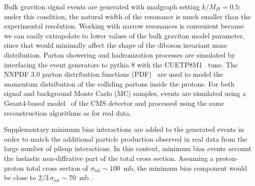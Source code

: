 Bulk graviton signal events are generated with {\sc madgraph} setting $k/M_{Pl} = 0.5$; 
under this condition, the natural width of the resonance is much smaller than the experimental resolution. Working with narrow resonances is convenient because we can easily extrapolate to lower values of the bulk graviton model parameter, since that would minimally affect the shape of the diboson invariant mass distribution.
Parton showering and hadronization processes are simulated by interfacing the event generators to {\sc pythia} 8 with the CUETP8M1~\cite{Skands:2014pea} tune.
The NNPDF 3.0 parton distribution functions (PDF)~\cite{Ball2015} are used to model the momentum distribution of the colliding partons inside the protons. For both signal and background Monte Carlo (MC) samples, events are simulated using a {\sc Geant4}-based model~\cite{GEANT4} of the CMS detector and processed using the same reconstruction algorithms as for real data. 

Supplementary minimum bias interactions are added to the generated events in order to match the additional particle production observed in real data from the large number of pileup interactions. In this context, minimum bias events account the inelastic non-diffrative part of the total cross section. Assuming a proton-proton total cross section of $\sigma_{tot} \sim 100$~mb, the minimum bias component would be close to $2/3\,\sigma_{tot} \sim 70$~mb \cite{CMS:2016ael}.


